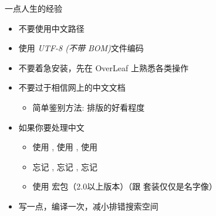 \begin{frame}{一点人生的经验}
  \begin{itemize}
    \item 不要使用中文路径
    \item 使用 \emph{UTF-8 (不带 BOM)}文件编码
    \item 不要着急安装，先在 OverLeaf 上熟悉各类操作
    \item 不要过于相信网上的中文文档
      \begin{itemize}
        \item 简单鉴别方法: 排版的好看程度
      \end{itemize}
    \item 如果你要处理中文
      \begin{itemize}
        \item 使用 \XeLaTeX, 使用 \XeLaTeX, 使用 \XeLaTeX
        \item 忘记 , 忘记 , 忘记 
        \item 使用  宏包（2.0以上版本）（跟 \CTeX 套装仅仅是名字像）
      \end{itemize}
    \item 写一点，编译一次，减小排错搜索空间
  \end{itemize}
\end{frame}





